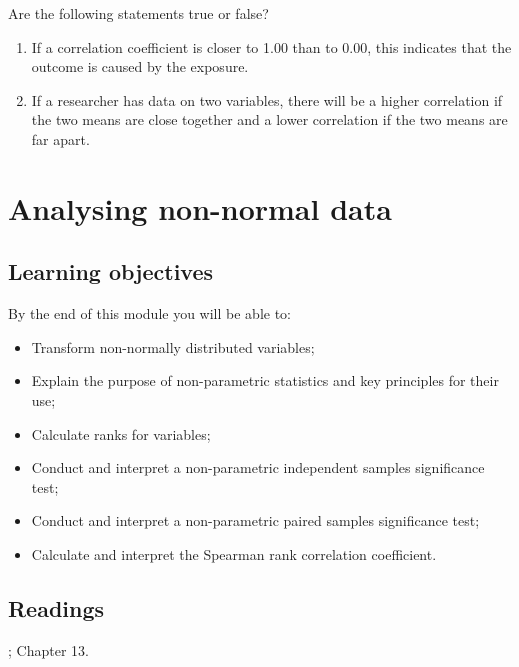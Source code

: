 \documentclass[
]{memoir}
\providecommand{\tightlist}{%
  \setlength{\itemsep}{0pt}\setlength{\parskip}{0pt}}
\begin{document}
Are the following statements true or false?

\begin{enumerate}
\def\labelenumi{\alph{enumi})}
\tightlist
\item
  If a correlation coefficient is closer to 1.00 than to 0.00, this indicates that the outcome is caused by the exposure.
\item
  If a researcher has data on two variables, there will be a higher correlation if the two means are close together and a lower correlation if the two means are far apart.
\end{enumerate}

\hypertarget{analysing-non-normal-data}{%
\chapter{Analysing non-normal data}\label{analysing-non-normal-data}}

\hypertarget{learning-objectives-8}{%
\section*{Learning objectives}\label{learning-objectives-8}}

By the end of this module you will be able to:

\begin{itemize}
\tightlist
\item
  Transform non-normally distributed variables;
\item
  Explain the purpose of non-parametric statistics and key principles for their use;
\item
  Calculate ranks for variables;
\item
  Conduct and interpret a non-parametric independent samples significance test;
\item
  Conduct and interpret a non-parametric paired samples significance test;
\item
  Calculate and interpret the Spearman rank correlation coefficient.
\end{itemize}

\hypertarget{readings-8}{%
\section*{Readings}\label{readings-8}}

\citet{kirkwood_sterne01}; Chapter 13.
\end{document}
